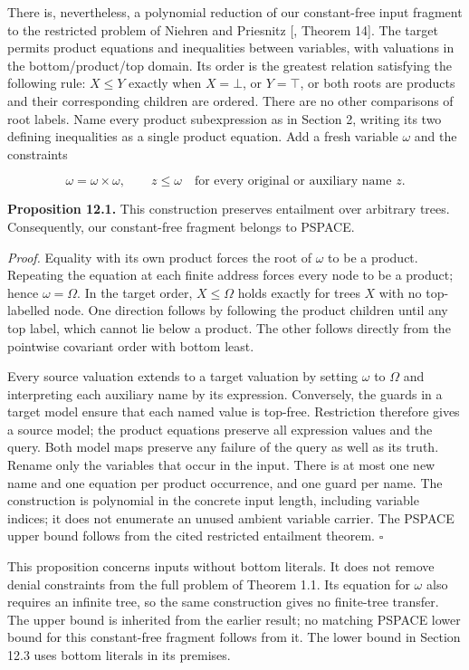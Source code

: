 \documentclass[
  11pt,
  a4paper,
]{article}
\begin{document}
There is, nevertheless, a polynomial reduction of our constant-free
input fragment to the restricted problem of Niehren and Priesnitz
{[}, Theorem 14{]}. The target permits product
equations and inequalities between variables, with valuations in the
bottom/product/top domain. Its order is the greatest relation satisfying
the following rule: \(X\le Y\) exactly when \(X=\bot\), or \(Y=\top\),
or both roots are products and their corresponding children are ordered.
There are no other comparisons of root labels. Name every product
subexpression as in Section 2, writing its two defining inequalities as
a single product equation. Add a fresh variable \(\omega\) and the
constraints

\[\omega=\omega\times\omega,
\qquad z\le\omega\quad\text{for every original or auxiliary name }z.\]


\textbf{Proposition 12.1.} This construction preserves entailment over
arbitrary trees. Consequently, our constant-free fragment belongs to
PSPACE.

\emph{Proof.} Equality with its own product forces the root of
\(\omega\) to be a product. Repeating the equation at each finite
address forces every node to be a product; hence \(\omega=\Omega\). In
the target order, \(X\le\Omega\) holds exactly for trees \(X\) with no
top-labelled node. One direction follows by following the product
children until any top label, which cannot lie below a product. The
other follows directly from the pointwise covariant order with bottom
least.

Every source valuation extends to a target valuation by setting
\(\omega\) to \(\Omega\) and interpreting each auxiliary name by its
expression. Conversely, the guards in a target model ensure that each
named value is top-free. Restriction therefore gives a source model; the
product equations preserve all expression values and the query. Both
model maps preserve any failure of the query as well as its truth.
Rename only the variables that occur in the input. There is at most one
new name and one equation per product occurrence, and one guard per
name. The construction is polynomial in the concrete input length,
including variable indices; it does not enumerate an unused ambient
variable carrier. The PSPACE upper bound follows from the cited
restricted entailment theorem. \(\square\)

This proposition concerns inputs without bottom literals. It does not
remove denial constraints from the full problem of Theorem 1.1. Its
equation for \(\omega\) also requires an infinite tree, so the same
construction gives no finite-tree transfer. The upper bound is inherited
from the earlier result; no matching PSPACE lower bound for this
constant-free fragment follows from it. The lower bound in Section 12.3
uses bottom literals in its premises.
\end{document}
